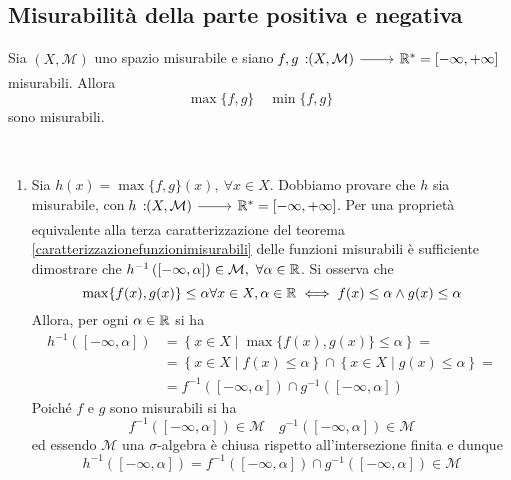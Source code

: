 \subsection{Misurabilità della parte positiva e negativa}\label{misuraparterealeimm}
\begin{proposition}
	Sia $ \left(X,\mathcal{M}\right)$ uno spazio misurabile e siano $\funz{f,g}{\left(X,\mathcal{M}\right)}{\realset^{\ast}=\left[-\infty,+\infty\right]}$ misurabili.
	Allora
	\begin{equation*}
		\max\{f,g\}\quad\min\{f,g\}
	\end{equation*}
	sono misurabili.
\end{proposition}
\begin{demonstration}~{}
	\begin{enumerate}
		\item Sia $ h(x)=\max\{f,g\}(x),\ \forall x\in X$. Dobbiamo provare che $h$ sia misurabile, con $\funz{h}{\left(X,\mathcal{M}\right)}{\realset^{\ast}=\left[-\infty,+\infty\right]}$. Per una proprietà equivalente alla terza caratterizzazione del teorema \ref{caratterizzazionefunzionimisurabili} delle funzioni misurabili è sufficiente dimostrare che $h^{-1}\left(\left[-\infty,\alpha\right]\right)\in\mathcal{M},\ \forall\alpha\in\realset$.
		Si osserva che
		\begin{equation*}
			\max\{f(x),g(x)\}\leq\alpha \forall x\in X, \alpha\in\mathbb{R}\iff f(x)\leq \alpha\wedge g(x)\leq \alpha
		\end{equation*}
	Allora, per ogni $\alpha\in\mathbb{R}$ si ha
	\begin{align*}
		h^{-1}\left(\left[-\infty,\alpha\right]\right)&=\left\{x\in X\mid \max\{f(x),g(x)\}\leq\alpha\right\}=\\
		&=\left\{x\in X\mid f(x)\leq \alpha\right\}\cap\left\{x\in X\mid g(x)\leq\alpha\right\}=\\
		&=f^{-1}\left(\left[-\infty,\alpha\right]\right)\cap g^{-1}\left(\left[-\infty,\alpha\right]\right)
	\end{align*}
	Poiché $f$ e $g$ sono misurabili si ha
	\begin{equation*}
	f^{-1}\left(\left[-\infty,\alpha\right]\right)\in\mathcal{M}\quad g^{-1}\left(\left[-\infty,\alpha\right]\right)\in\mathcal{M}
	\end{equation*}
	ed essendo $\mathcal{M}$ una $\sigma$-algebra è chiusa rispetto all'intersezione finita e dunque
	\begin{equation*}
		h^{-1}\left(\left[-\infty,\alpha\right]\right)=f^{-1}\left(\left[-\infty,\alpha\right]\right)\cap g^{-1}\left(\left[-\infty,\alpha\right]\right)\in\mathcal{M}

\end{equation*}
\end{enumerate}
\end{demonstration}
